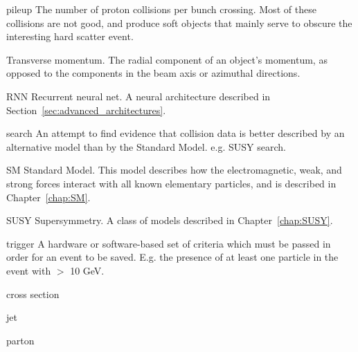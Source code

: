 \begin{symbollist*}
\item[pileup] The number of proton collisions per bunch crossing. Most of these collisions are not good, and produce soft objects that mainly serve to obscure the interesting hard scatter event.
\item[\pt] Transverse momentum. The radial component of an object's momentum, as opposed to the components in the beam axis or azimuthal directions.
\item[RNN] Recurrent neural net. A neural architecture described in Section~\ref{sec:advanced_architectures}.
\item[search] An attempt to find evidence that collision data is better described by an alternative model than by the Standard Model. e.g. SUSY search.
\item[SM] Standard Model. This model describes how the electromagnetic, weak, and strong forces interact with all known elementary particles, and is described in Chapter~\ref{chap:SM}.
\item[SUSY] Supersymmetry. A class of models described in Chapter~\ref{chap:SUSY}.
\item[trigger] A hardware or software-based set of criteria which must be passed in order for an event to be saved. E.g. the presence of at least one particle in the event with \pt $>$ 10 GeV.

\item[cross section]
\item[jet]
\item[parton]

\end{symbollist*}